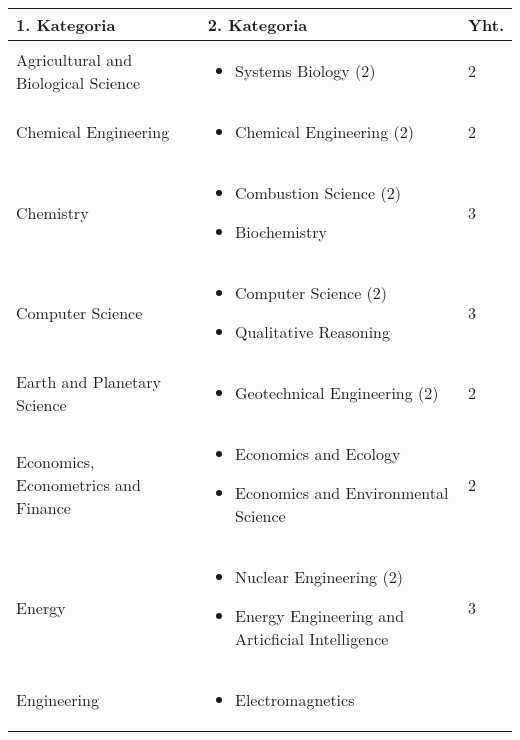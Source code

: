 \documentclass[utf8]{gradu3}
\begin{document}
\begin{longtable}[h]{|p{5cm}|p{8cm}|p{1cm}|}
    \hline
    \textbf{1. Kategoria}    & \textbf{2. Kategoria} & \textbf{Yht.} \\
    \hline
    Agricultural and Biological Science & \begin{itemize}
        \item Systems Biology (2)
    \end{itemize} & 2 \\
    \hline
    Chemical Engineering & \begin{itemize}
        \item Chemical Engineering (2)
    \end{itemize} & 2 \\
    \hline
    Chemistry & \begin{itemize}
        \item Combustion Science (2)
        \item Biochemistry
    \end{itemize} & 3 \\
    \hline
    Computer Science & \begin{itemize}
        \item Computer Science (2)
        \item Qualitative Reasoning
    \end{itemize} & 3 \\
    \hline
    Earth and Planetary Science & \begin{itemize}
        \item Geotechnical Engineering (2)
    \end{itemize} & 2 \\
    \hline
    Economics, Econometrics and Finance & \begin{itemize}
        \item Economics and Ecology
        \item Economics and Environmental Science
    \end{itemize} & 2 \\
    \hline
    Energy & \begin{itemize}
        \item Nuclear Engineering (2)
        \item Energy Engineering and Articficial Intelligence
    \end{itemize} & 3 \\
    \hline 
    Engineering & \begin{itemize}
        \item Electromagnetics

\end{itemize}
\end{longtable}
\end{document}
